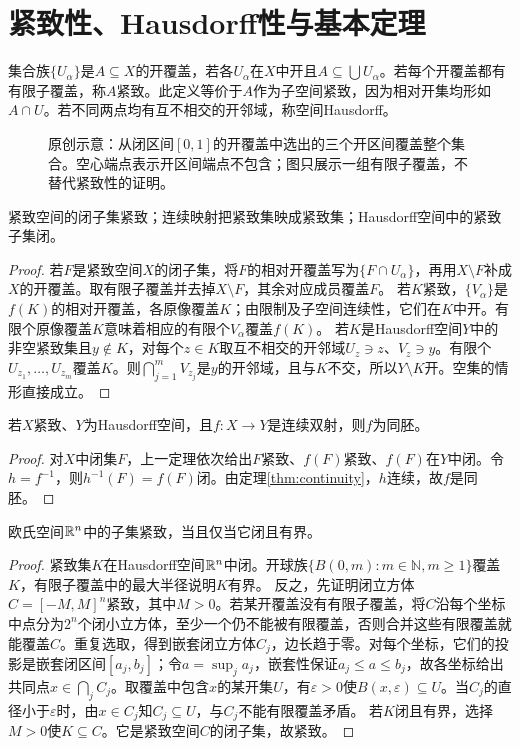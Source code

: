 \section{紧致性、Hausdorff性与基本定理}
\begin{definition}
集合族$\{U_\alpha\}$是$A\subseteq X$的开覆盖，若各$U_\alpha$在$X$中开且$A\subseteq\bigcup U_\alpha$。若每个开覆盖都有有限子覆盖，称$A$紧致。此定义等价于$A$作为子空间紧致，因为相对开集均形如$A\cap U$。若不同两点均有互不相交的开邻域，称空间Hausdorff。
\end{definition}
\begin{figure}[htbp]
\centering

\caption{原创示意：从闭区间$[0,1]$的开覆盖中选出的三个开区间覆盖整个集合。空心端点表示开区间端点不包含；图只展示一组有限子覆盖，不替代紧致性的证明。}
\label{fig:compact-cover}
\end{figure}
\begin{theorem}[紧致性的三条工具]\label{thm:compact-tools}
紧致空间的闭子集紧致；连续映射把紧致集映成紧致集；Hausdorff空间中的紧致子集闭。
\end{theorem}
\begin{proof}
若$F$是紧致空间$X$的闭子集，将$F$的相对开覆盖写为$\{F\cap U_\alpha\}$，再用$X\setminus F$补成$X$的开覆盖。取有限子覆盖并去掉$X\setminus F$，其余对应成员覆盖$F$。
若$K$紧致，$\{V_\alpha\}$是$f(K)$的相对开覆盖，各原像覆盖$K$；由限制及子空间连续性，它们在$K$中开。有限个原像覆盖$K$意味着相应的有限个$V_\alpha$覆盖$f(K)$。
若$K$是Hausdorff空间$Y$中的非空紧致集且$y\notin K$，对每个$z\in K$取互不相交的开邻域$U_z\ni z$、$V_z\ni y$。有限个$U_{z_1},\ldots,U_{z_m}$覆盖$K$。则$\bigcap_{j=1}^mV_{z_j}$是$y$的开邻域，且与$K$不交，所以$Y\setminus K$开。空集的情形直接成立。
\end{proof}
\begin{theorem}[紧致到Hausdorff的连续双射]\label{thm:compact-homeomorphism}
若$X$紧致、$Y$为Hausdorff空间，且$f:X\to Y$是连续双射，则$f$为同胚。
\end{theorem}
\begin{proof}
对$X$中闭集$F$，上一定理依次给出$F$紧致、$f(F)$紧致、$f(F)$在$Y$中闭。令$h=f^{-1}$，则$h^{-1}(F)=f(F)$闭。由定理\ref{thm:continuity}，$h$连续，故$f$是同胚。
\end{proof}
\begin{theorem}\label{thm:heine-borel}
欧氏空间$\mathbb{R}^n$中的子集紧致，当且仅当它闭且有界。
\end{theorem}
\begin{proof}
紧致集$K$在Hausdorff空间$\mathbb{R}^n$中闭。开球族$\{B(0,m):m\in\mathbb N,m\geq1\}$覆盖$K$，有限子覆盖中的最大半径说明$K$有界。
反之，先证明闭立方体$C=[-M,M]^n$紧致，其中$M>0$。若某开覆盖没有有限子覆盖，将$C$沿每个坐标中点分为$2^n$个闭小立方体，至少一个仍不能被有限覆盖，否则合并这些有限覆盖就能覆盖$C$。重复选取，得到嵌套闭立方体$C_j$，边长趋于零。对每个坐标，它们的投影是嵌套闭区间$[a_j,b_j]$；令$a=\sup_j a_j$，嵌套性保证$a_j\leq a\leq b_j$，故各坐标给出共同点$x\in\bigcap_jC_j$。取覆盖中包含$x$的某开集$U$，有$\varepsilon>0$使$B(x,\varepsilon)\subseteq U$。当$C_j$的直径小于$\varepsilon$时，由$x\in C_j$知$C_j\subseteq U$，与$C_j$不能有限覆盖矛盾。
若$K$闭且有界，选择$M>0$使$K\subseteq C$。它是紧致空间$C$的闭子集，故紧致。
\end{proof}
